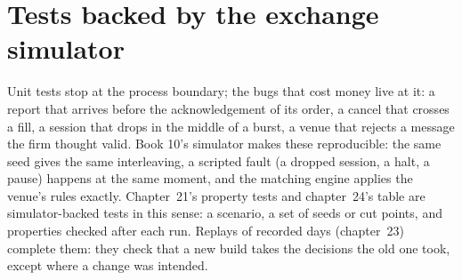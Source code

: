 \begin{omfigure}

\label{fig:ll:testing-and-deploying-low-latency-systems:pyramid}
\end{omfigure}

\section{Tests backed by the exchange simulator}

Unit tests stop at the process boundary; the bugs that cost money live at it: a report that arrives before the acknowledgement
of its order, a cancel that crosses a fill, a session that drops in the middle of a burst, a venue that rejects a message the
firm thought valid. Book 10's simulator makes these reproducible: the same seed gives the same interleaving, a scripted fault
(a dropped session, a halt, a pause) happens at the same moment, and the matching engine applies the venue's rules exactly.
Chapter~21's property tests and chapter~24's  table are simulator-backed tests in this sense: a scenario, a set of
seeds or cut points, and properties checked after each run. Replays of recorded days (chapter~23) complete them: they check
that a new build takes the decisions the old one took, except where a change was intended.

